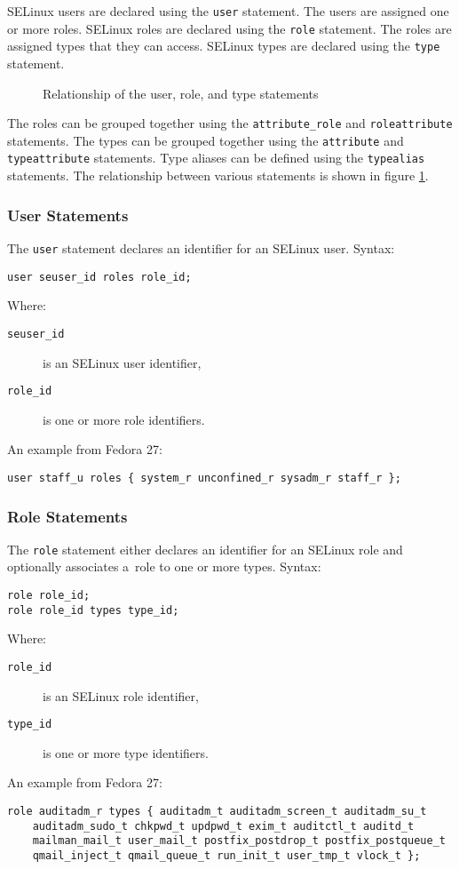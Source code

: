SELinux users are declared using the \texttt{user} statement. The users are
assigned one or more roles. SELinux roles are declared using the \texttt{role}
statement. The roles are assigned types that they can access. SELinux types are
declared using the \texttt{type} statement.

\begin{figure}
    \centering
    \label{fig:userroletype}
    
    \caption{Relationship of the user, role, and type statements}
\end{figure}

The roles can be grouped together using the \texttt{attribute\_role} and
\texttt{roleattribute} statements. The types can be grouped together using the
\texttt{attribute} and \texttt{typeattribute} statements. Type aliases can be
defined using the \texttt{typealias} statements. The relationship between
various statements is shown in figure \ref{fig:userroletype}.

\subsubsection{User Statements}
The \texttt{user} statement declares an identifier for an SELinux user. Syntax:
\begin{lstlisting}[language=te]
user seuser_id roles role_id;
\end{lstlisting}
Where:
\begin{description}
    \item [\texttt{seuser\_id}] is an SELinux user identifier,
    \item [\texttt{role\_id}] is one or more role identifiers.
\end{description}
An example from Fedora 27:
\begin{lstlisting}[language=te]
user staff_u roles { system_r unconfined_r sysadm_r staff_r };
\end{lstlisting}

\subsubsection{Role Statements}
The \texttt{role} statement either declares an identifier for an SELinux role
and optionally associates a~role to one or more types. Syntax:
\begin{lstlisting}[language=te]
role role_id;
role role_id types type_id;
\end{lstlisting}
Where:
\begin{description}
    \item [\texttt{role\_id}] is an SELinux role identifier,
    \item [\texttt{type\_id}] is one or more type identifiers.
\end{description}
An example from Fedora 27:
\begin{lstlisting}[language=te]
role auditadm_r types { auditadm_t auditadm_screen_t auditadm_su_t
    auditadm_sudo_t chkpwd_t updpwd_t exim_t auditctl_t auditd_t
    mailman_mail_t user_mail_t postfix_postdrop_t postfix_postqueue_t
    qmail_inject_t qmail_queue_t run_init_t user_tmp_t vlock_t };
\end{lstlisting}

